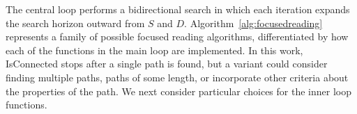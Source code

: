 The central loop performs a bidirectional search in which each iteration expands the search horizon outward from $S$ and $D$.  
Algorithm~\ref{alg:focusedreading} represents a family of possible focused reading algorithms, differentiated by how each of the functions in the main loop are implemented.  In this work, {\sc IsConnected} stops after a single path is found, but a variant could consider finding multiple paths, paths of some length, or incorporate other criteria about the properties of the path.  We next consider particular choices for the inner loop functions.

%




